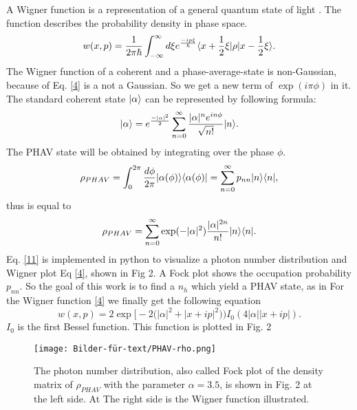 \documentclass[12pt,a4paper]{article}
\DeclarePairedDelimiter\bra{\langle}{\rvert}
\DeclarePairedDelimiter\ket{\lvert}{\rangle}
\begin{document}
A Wigner function is a representation of a general quantum state of light \cite{Allevi2013}.
The function describes the probability density in phase space.
\begin{equation}
w(x,p)=\frac{1}{2\pi \hbar}\int_{- \infty}^{\infty} d\xi e^{\frac{-i p \xi}{\hbar}}\bra{x+\frac{1}{2}\xi}\rho\ket{x-\frac{1}{2}\xi}.\label{4}
\end{equation}
The Wigner function of a coherent and a phase-average-state is non-Gaussian, because of Eq. \eqref{4}  is a  not a Gaussian. 
 So we get a new term of $\exp(i\pi\phi)$ in it. 
The standard coherent state $\ket{\alpha}$ can be represented by following formula: 
\begin{equation}
\ket{\alpha}=e^{\frac{-|\alpha|^2}{2}}\sum_{n=0}^{\infty}\frac{|\alpha|^n e^{in\phi}}{\sqrt{n!}} \ket{n}.
\end{equation}
The PHAV state will be obtained by integrating over the phase $\phi$.
\begin{equation}
\rho_{PHAV}=\int_0 ^{2\pi}\frac{d\phi}{2\pi}\ket{\alpha(\phi)}\bra{\alpha(\phi)}=\sum_{n=0}^{\infty}p_{nn}\ket{n}\bra{n},\label{22}
\end{equation}
thus is equal to
\begin{equation}
\rho_{PHAV}= \sum_{n=0}^{\infty}\exp(-|\alpha|^2)\frac{|\alpha|^{2n}}{n!} \ket{n}\bra{n}.\label{11}
\end{equation}
Eq. \eqref{11} is implemented in python to visualize a photon number distribution and Wigner plot  Eq \eqref{4}, shown in Fig 2.
A Fock plot shows the occupation probability $p_{nn}$.
So the goal of this work is to find a $n_h$ which yield a PHAV state,
as in \cite{Allevi2013} 
For the Wigner function \eqref{4} we finally get the following equation
\begin{equation}
w(x,p)=2  \exp\bigl[-2\bigl(|\alpha|^2+|x+ip|^2\bigr)\bigr) I_0 (4|\alpha| |x+ip|).
\end{equation}
$I_0$ is the first  Bessel function.
This function is plotted in Fig. 2
\begin{figure}[hbtp]
\hspace{-1.4cm}
\texttt{[image: Bilder-für-text/PHAV-rho.png]}\label{21}
\caption{The photon number distribution, also called Fock plot of the density matrix of $\rho_{PHAV}$ with the parameter $\alpha=3.5$, is shown in Fig. 2 at the left side. At The right side is the Wigner function illustrated.}
\end{figure}
\end{document}
